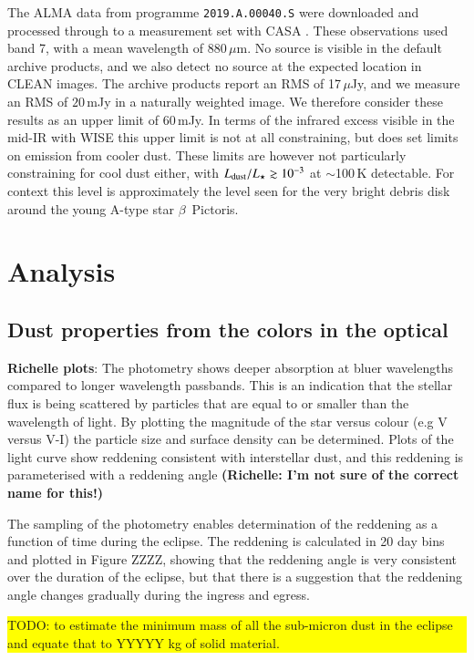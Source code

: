 \documentclass{aa}
\newcommand{\todo}[1]{
\colorbox{yellow}{
\begin{minipage}{0.8\linewidth}
\color{red}
TODO: #1
\end{minipage}
}}
\begin{document}
The ALMA data from programme \texttt{2019.A.00040.S} were downloaded and processed through to a measurement set with CASA \citep{2007ASPC..376..127M}. These observations used band 7, with a mean wavelength of 880\,$\mu$m.
%
No source is visible in the default archive products, and we also detect no source at the expected location in CLEAN images.
%
The archive products report an RMS of 17\,$\mu$Jy, and we measure an RMS of $20$\,mJy in a naturally weighted image. We therefore consider these results as an upper limit of $60$\,mJy.
%
In terms of the infrared excess visible in the mid-IR with WISE this upper limit is not at all constraining, but does set limits on emission from cooler dust.
%
These limits are however not particularly constraining for cool dust either, with $L_{\rm dust}/L_\star \gtrsim 10^{-3}$ at $\sim$100\,K detectable. For context this level is approximately the level seen for the very bright debris disk around the young A-type star $\beta$~Pictoris.

\section{Analysis}\label{sec:dustcloud}

\subsection{Dust properties from the colors in the optical}

{\bf Richelle plots}: The photometry shows deeper absorption at bluer wavelengths compared to longer wavelength passbands.
%
This is an indication that the stellar flux is being scattered by particles that are equal to or smaller than the wavelength of light.
%
By plotting the magnitude of the star versus colour (e.g V versus V-I) the particle size and surface density can be determined.
%
Plots of the light curve show reddening consistent with interstellar dust, and this reddening is parameterised with a reddening angle {\bf (Richelle: I'm not sure of the correct name for this!)}

The sampling of the photometry enables determination of the reddening as a function of time during the eclipse.
%
The reddening is calculated in 20 day bins and plotted in Figure ZZZZ, showing that the reddening angle is very consistent over the duration of the eclipse, but that there is a suggestion that the reddening angle changes gradually during the ingress and egress.

\todo{to estimate the minimum mass of all the sub-micron dust in the eclipse and equate that to YYYYY kg of solid material.}
\end{document}
